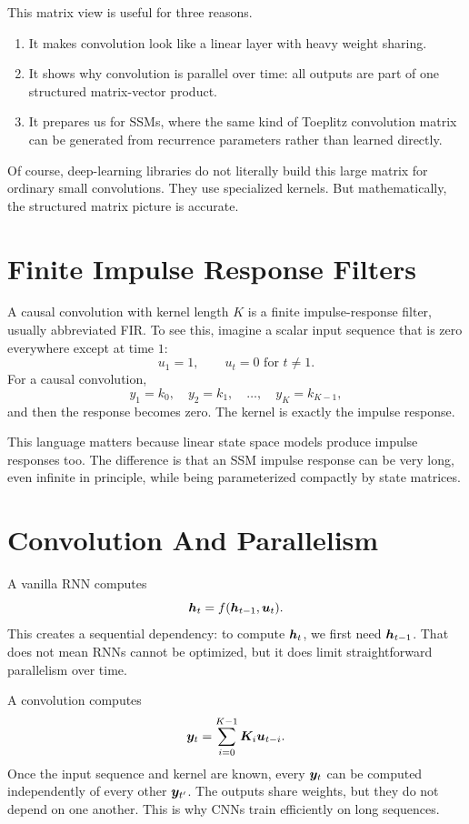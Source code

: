 This matrix view is useful for three reasons.

\begin{enumerate}
  \item It makes convolution look like a linear layer with heavy weight sharing.
  \item It shows why convolution is parallel over time: all outputs are part of one
  structured matrix-vector product.
  \item It prepares us for SSMs, where the same kind of Toeplitz convolution matrix can
  be generated from recurrence parameters rather than learned directly.
\end{enumerate}

Of course, deep-learning libraries do not literally build this large matrix for ordinary
small convolutions. They use specialized kernels. But mathematically, the structured
matrix picture is accurate.

\section{Finite Impulse Response Filters}

A causal convolution with kernel length $K$ is a finite impulse-response filter, usually
abbreviated FIR. To see this, imagine a scalar input sequence that is zero everywhere
except at time $1$:
\[
  u_1 = 1,
  \qquad
  u_t = 0 \text{ for } t \neq 1.
\]
For a causal convolution,
\[
  y_1 = k_0,\quad
  y_2 = k_1,\quad
  \ldots,\quad
  y_K = k_{K-1},
\]
and then the response becomes zero. The kernel is exactly the impulse response.

This language matters because linear state space models produce impulse responses too.
The difference is that an SSM impulse response can be very long, even infinite in
principle, while being parameterized compactly by state matrices.

\section{Convolution And Parallelism}

A vanilla RNN computes
\[
  \bm{h}_t = f(\bm{h}_{t-1}, \bm{u}_t).
\]
This creates a sequential dependency: to compute $\bm{h}_t$, we first need $\bm{h}_{t-1}$.
That does not mean RNNs cannot be optimized, but it does limit straightforward parallelism
over time.

A convolution computes
\[
  \bm{y}_t = \sum_{i=0}^{K-1} \bm{K}_i \bm{u}_{t-i}.
\]
Once the input sequence and kernel are known, every $\bm{y}_t$ can be computed independently
of every other $\bm{y}_{t'}$. The outputs share weights, but they do not depend on one
another. This is why CNNs train efficiently on long sequences.

